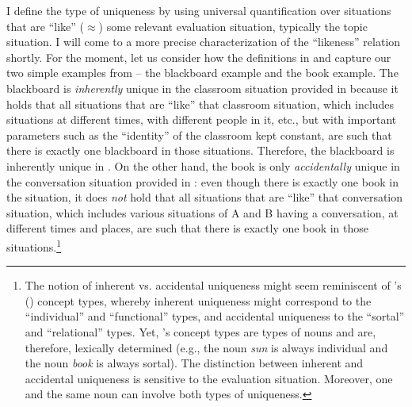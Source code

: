 \documentclass[output=paper,colorlinks,citecolor=brown,newtxmath]{langscibook}
\begin{document}
I define the type of uniqueness by using universal quantification over situations that are ``like'' ($\approx$) some relevant evaluation situation, typically the topic situation. I will come to a more precise characterization of the ``likeness'' relation shortly. For the moment, let us consider how the definitions in  and  capture our two simple examples from  -- the blackboard example and the book example. The blackboard is \textit{inherently} unique in the classroom situation provided in  because it holds that all situations that are ``like'' that classroom situation, which includes situations at different times, with different people in it, etc., but with important parameters such as the ``identity'' of the classroom kept constant, are such that there is exactly one blackboard in those situations. Therefore, the blackboard is inherently unique in . On the other hand, the book is only \textit{accidentally} unique in the conversation situation provided in : even though there is exactly one book in the situation, it does \textit{not} hold that all situations that are ``like'' that conversation situation, which includes various situations of A and B having a conversation, at different times and places, are such that there is exactly one book in those situations.\footnote{The notion of inherent vs. accidental uniqueness might seem reminiscent of \citeauthor{Lobner1985}'s (\citeyear{Lobner1985,Lobner2011}) concept types, whereby inherent uniqueness might correspond to the ``individual'' and ``functional'' types, and accidental uniqueness to the ``sortal'' and ``relational'' types. Yet, \citeauthor{Lobner1985}'s concept types are types of nouns and are, therefore, lexically determined (e.g., the noun \textit{sun} is always individual and the noun \textit{book} is always sortal). The distinction between inherent and accidental uniqueness is sensitive to the evaluation situation. Moreover, one and the same noun can involve both types of uniqueness.}
\end{document}
